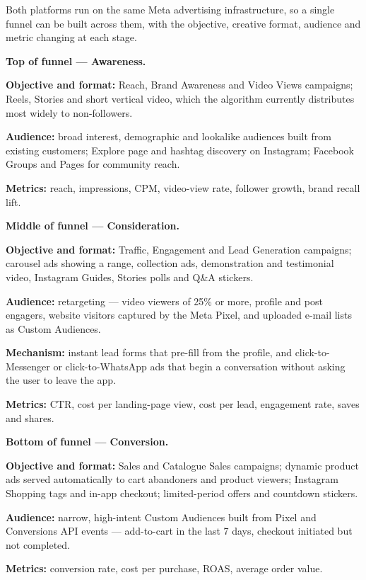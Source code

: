 \partb

\begin{qlist}

Both platforms run on the same Meta advertising infrastructure, so a single
funnel can be built across them, with the objective, creative format, audience
and metric changing at each stage.

\textbf{Top of funnel --- Awareness.}
\begin{apts}
\item \textbf{Objective and format:} Reach, Brand Awareness and Video Views
      campaigns; Reels, Stories and short vertical video, which the algorithm
      currently distributes most widely to non-followers.
\item \textbf{Audience:} broad interest, demographic and lookalike audiences
      built from existing customers; Explore page and hashtag discovery on
      Instagram; Facebook Groups and Pages for community reach.
\item \textbf{Metrics:} reach, impressions, CPM, video-view rate, follower
      growth, brand recall lift.
\end{apts}

\textbf{Middle of funnel --- Consideration.}
\begin{apts}\setcounter{enumi}{3}
\item \textbf{Objective and format:} Traffic, Engagement and Lead Generation
      campaigns; carousel ads showing a range, collection ads, demonstration
      and testimonial video, Instagram Guides, Stories polls and Q\&A stickers.
\item \textbf{Audience:} retargeting --- video viewers of 25\% or more, profile
      and post engagers, website visitors captured by the Meta Pixel, and
      uploaded e-mail lists as Custom Audiences.
\item \textbf{Mechanism:} instant lead forms that pre-fill from the profile,
      and click-to-Messenger or click-to-WhatsApp ads that begin a conversation
      without asking the user to leave the app.
\item \textbf{Metrics:} CTR, cost per landing-page view, cost per lead,
      engagement rate, saves and shares.
\end{apts}

\textbf{Bottom of funnel --- Conversion.}
\begin{apts}\setcounter{enumi}{7}
\item \textbf{Objective and format:} Sales and Catalogue Sales campaigns;
      dynamic product ads served automatically to cart abandoners and product
      viewers; Instagram Shopping tags and in-app checkout; limited-period
      offers and countdown stickers.
\item \textbf{Audience:} narrow, high-intent Custom Audiences built from Pixel
      and Conversions API events --- add-to-cart in the last 7 days, checkout
      initiated but not completed.
\item \textbf{Metrics:} conversion rate, cost per purchase, ROAS, average order
      value.
\end{apts}


\end{qlist}
